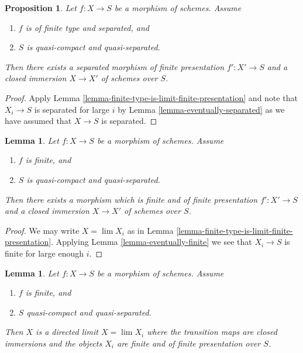 \documentclass{stacks-project}
\theoremstyle{plain}
\newtheorem{proposition}[subsection]{Proposition}
\newtheorem{lemma}[subsection]{Lemma}
\theoremstyle{definition}
\theoremstyle{remark}
\numberwithin{equation}{subsection}
\def\lim{\mathop{\mathrm{lim}}\nolimits}
\begin{document}
\begin{proposition}
\label{proposition-separated-closed-in-finite-presentation}
Let $f : X \to S$ be a morphism of schemes. Assume
\begin{enumerate}
\item $f$ is of finite type and separated, and
\item $S$ is quasi-compact and quasi-separated.
\end{enumerate}
Then there exists a separated morphism of finite presentation
$f' : X' \to S$ and a closed immersion $X \to X'$ of schemes over $S$.
\end{proposition}

\begin{proof}
Apply Lemma \ref{lemma-finite-type-is-limit-finite-presentation}
and note that $X_i \to S$ is separated for
large $i$ by Lemma \ref{lemma-eventually-separated} as we have
assumed that $X \to S$ is separated.
\end{proof}

\begin{lemma}
\label{lemma-finite-closed-in-finite-finite-presentation}
Let $f : X \to S$ be a morphism of schemes. Assume
\begin{enumerate}
\item $f$ is finite, and
\item $S$ is quasi-compact and quasi-separated.
\end{enumerate}
Then there exists a morphism which is finite and of finite presentation
$f' : X' \to S$ and a closed immersion $X \to X'$ of schemes over $S$.
\end{lemma}

\begin{proof}
We may write $X = \lim X_i$ as in
Lemma \ref{lemma-finite-type-is-limit-finite-presentation}.
Applying Lemma \ref{lemma-eventually-finite} we see that $X_i \to S$
is finite for large enough $i$.
\end{proof}

\begin{lemma}
\label{lemma-finite-in-finite-and-finite-presentation}
Let $f : X \to S$ be a morphism of schemes. Assume
\begin{enumerate}
\item $f$ is finite, and
\item $S$ quasi-compact and quasi-separated.
\end{enumerate}
Then $X$ is a directed limit $X = \lim X_i$
where the transition maps are closed immersions and the objects
$X_i$ are finite and of finite presentation over $S$.
\end{lemma}
\end{document}
